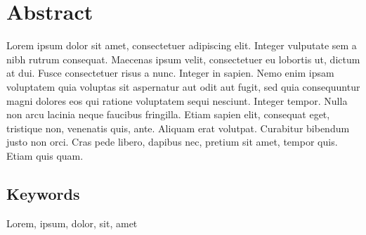 \chapter*{Abstract}

\noindent
Lorem ipsum dolor sit amet, consectetuer adipiscing elit. Integer vulputate sem a nibh rutrum consequat. Maecenas ipsum velit, consectetuer eu lobortis ut, dictum at dui. Fusce consectetuer risus a nunc. Integer in sapien. Nemo enim ipsam voluptatem quia voluptas sit aspernatur aut odit aut fugit, sed quia consequuntur magni dolores eos qui ratione voluptatem sequi nesciunt. Integer tempor. Nulla non arcu lacinia neque faucibus fringilla. Etiam sapien elit, consequat eget, tristique non, venenatis quis, ante. Aliquam erat volutpat. Curabitur bibendum justo non orci. Cras pede libero, dapibus nec, pretium sit amet, tempor quis. Etiam quis quam.

\section*{Keywords}
\noindent
Lorem, ipsum, dolor, sit, amet
